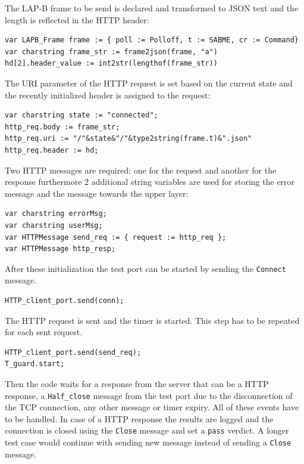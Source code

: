 \documentclass[a4paper]{article}
\begin{document}
The LAP-B frame to be send is declared and transformed to JSON text and the length is reflected in the HTTP header:

{\footnotesize
\begin{lstlisting}
var LAPB_Frame frame := { poll := Polloff, t := SABME, cr := Command}
var charstring frame_str := frame2json(frame, "a")
hd[2].header_value := int2str(lengthof(frame_str))
\end{lstlisting}
}

The URI parameter of the HTTP request is set based on the current state and the recently initialized header is assigned to the request:

{\footnotesize
\begin{lstlisting}
var charstring state := "connected";
http_req.body := frame_str;
http_req.uri := "/"&state&"/"&type2string(frame.t)&".json"
http_req.header := hd;
\end{lstlisting}
}

Two HTTP messages are required: one for the request and another for the response furthermore 2 additional string variables are used for storing the error message and the message towards the upper layer:

{\footnotesize
\begin{lstlisting}
var charstring errorMsg;
var charstring userMsg;
var HTTPMessage send_req := { request := http_req };
var HTTPMessage http_resp;
\end{lstlisting}
}

After these initialization the test port can be started by sending the \verb!Connect! message.

{\footnotesize
\begin{lstlisting}
HTTP_client_port.send(conn);
\end{lstlisting}
}

The HTTP request is sent and the timer is started. This step has to be repeated for each sent request.

{\footnotesize
\begin{lstlisting}
HTTP_client_port.send(send_req);
T_guard.start;
\end{lstlisting}
}

Then the code waits for a response from the server that can be a HTTP response, a \verb!Half_close! message from the test port due to the disconnection of the TCP connection, any other message or timer expiry. All of these events have to be handled. In case of a HTTP response the results are logged and the connection is closed using the \verb!Close! message and set a \verb!pass! verdict. A longer test case would continue with sending new message instead of sending a \verb!Close! message.
\end{document}
